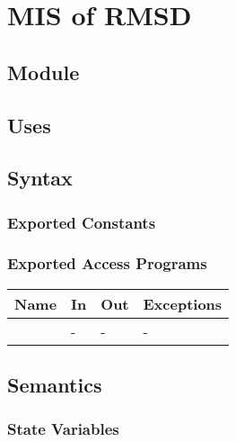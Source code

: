 \documentclass[12pt, titlepage]{article}
\begin{document}
\newpage

\section{MIS of RMSD} \label{section-rmsd}



\subsection{Module}


\subsection{Uses}


\subsection{Syntax}

\subsubsection{Exported Constants}

\subsubsection{Exported Access Programs}

\begin{center}
	\begin{tabular}{p{2cm} p{4cm} p{4cm} p{2cm}}
		\hline
		\textbf{Name} & \textbf{In} & \textbf{Out} & \textbf{Exceptions} \\
		\hline
		\wss{accessProg} & - & - & - \\
		\hline
	\end{tabular}
\end{center}

\subsection{Semantics}

\subsubsection{State Variables}
\end{document}
